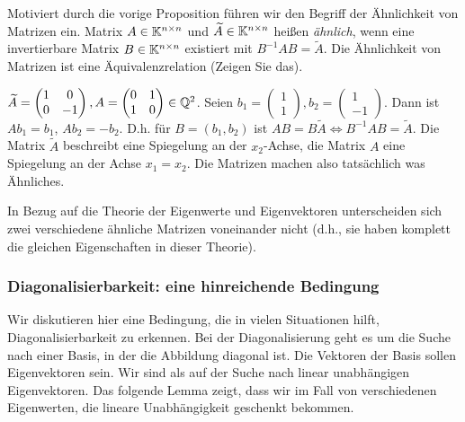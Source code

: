 \noindent Motiviert durch die vorige Proposition führen wir den Begriff der Ähnlichkeit von Matrizen ein. Matrix $ A \in \mathbb K^{n \times n} $ und $ \widetilde{A} \in \mathbb K^{n \times n} $ heißen \emph{ähnlich}, wenn eine invertierbare Matrix $ B \in \mathbb K^{n \times n} $ existiert mit $ B^{-1}AB = \widetilde{A} $.
Die Ähnlichkeit von Matrizen ist eine Äquivalenzrelation (Zeigen Sie das). 

\begin{bsp}
	$ \widetilde{A} = \begin{pmatrix}
		1 & 0 \\
		0 & -1
	\end{pmatrix}, A = \begin{pmatrix}
		0 & 1 \\
		1 & 0
	\end{pmatrix} \in \mathbb Q^2 $. Seien $ b_1 = \begin{pmatrix}
		1 \\ 1
	\end{pmatrix}, b_2 = \begin{pmatrix}
		1 \\ -1
	\end{pmatrix} $. Dann ist $ Ab_1 = b_1 $, $ Ab_2 = -b_2 $. D.h. für $ B = (b_1, b_2) $ ist $ AB = B\widetilde{A} \Leftrightarrow B^{-1}AB = \widetilde{A} $. Die Matrix $\widetilde{A}$ beschreibt eine Spiegelung an der $x_2$-Achse, die Matrix $A$ eine Spiegelung an der Achse $x_1=x_2$. Die Matrizen machen also tatsächlich was Ähnliches. 
\end{bsp}

In Bezug auf die Theorie der Eigenwerte und Eigenvektoren unterscheiden sich zwei verschiedene ähnliche Matrizen voneinander nicht (d.h., sie haben komplett die gleichen Eigenschaften in dieser Theorie).

\subsubsection{Diagonalisierbarkeit: eine hinreichende Bedingung}
\label{sec:6_1_4}

Wir diskutieren hier eine Bedingung, die in vielen Situationen hilft, Diagonalisierbarkeit zu erkennen. Bei der Diagonalisierung geht es um die Suche nach einer Basis, in der die Abbildung diagonal ist. Die Vektoren der Basis sollen Eigenvektoren sein. Wir sind als auf der Suche nach linear unabhängigen Eigenvektoren. Das folgende Lemma zeigt, dass wir im Fall von verschiedenen Eigenwerten, die lineare Unabhängigkeit geschenkt bekommen. 

